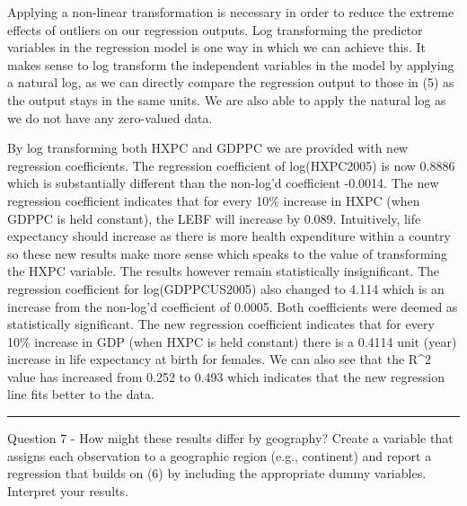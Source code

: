 \documentclass[
]{article}
\newenvironment{Shaded}{\begin{snugshade}}{\end{snugshade}}
\newcommand{\AttributeTok}[1]{\textcolor[rgb]{0.77,0.63,0.00}{#1}}
\newcommand{\FunctionTok}[1]{\textcolor[rgb]{0.00,0.00,0.00}{#1}}
\newcommand{\NormalTok}[1]{#1}
\newcommand{\OtherTok}[1]{\textcolor[rgb]{0.56,0.35,0.01}{#1}}
\newcommand{\SpecialCharTok}[1]{\textcolor[rgb]{0.00,0.00,0.00}{#1}}
\newcommand{\StringTok}[1]{\textcolor[rgb]{0.31,0.60,0.02}{#1}}
\begin{document}
Applying a non-linear transformation is necessary in order to reduce the
extreme effects of outliers on our regression outputs. Log transforming
the predictor variables in the regression model is one way in which we
can achieve this. It makes sense to log transform the independent
variables in the model by applying a natural log, as we can directly
compare the regression output to those in (5) as the output stays in the
same units. We are also able to apply the natural log as we do not have
any zero-valued data.

By log transforming both HXPC and GDPPC we are provided with new
regression coefficients. The regression coefficient of log(HXPC2005) is
now 0.8886 which is substantially different than the non-log'd
coefficient -0.0014. The new regression coefficient indicates that for
every 10\% increase in HXPC (when GDPPC is held constant), the LEBF will
increase by 0.089. Intuitively, life expectancy should increase as there
is more health expenditure within a country so these new results make
more sense which speaks to the value of transforming the HXPC variable.
The results however remain statistically insignificant. The regression
coefficient for log(GDPPCUS2005) also changed to 4.114 which is an
increase from the non-log'd coefficient of 0.0005. Both coefficients
were deemed as statistically significant. The new regression coefficient
indicates that for every 10\% increase in GDP (when HXPC is held
constant) there is a 0.4114 unit (year) increase in life expectancy at
birth for females. We can also see that the R\^{}2 value has increased
from 0.252 to 0.493 which indicates that the new regression line fits
better to the data.

\begin{center}\rule{0.5\linewidth}{0.5pt}\end{center}

Question 7 - How might these results differ by geography? Create a
variable that assigns each observation to a geographic region (e.g.,
continent) and report a regression that builds on (6) by including the
appropriate dummy variables. Interpret your results.

\begin{Shaded}
\end{Shaded}
\end{document}
